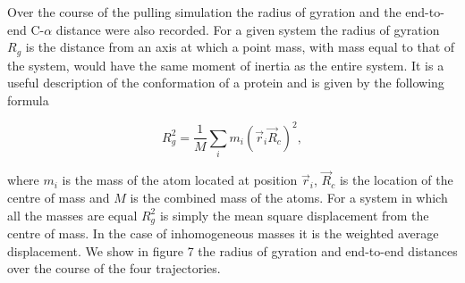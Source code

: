 \documentclass[12pt, onecolumn]{revtex4}    %
\begin{document}
Over the course of the pulling simulation the radius of gyration and the end-to-end C-$\alpha$ distance were also recorded.  For a given system the radius of gyration $R_g$ is the distance from an axis at which a point mass, with mass equal to that of the system, would have the same moment of inertia as the entire system.  It is a useful description of the conformation of a protein \cite{Rgyr} and is given by the following formula

\begin{equation}
R_g^2 = \frac{1}{M}\sum_i m_i (\vec{r}_i \vec{R}_c )^2, 
\end{equation}

where $m_i$ is the mass of the atom located at position $\vec{r}_i$, $\vec{R}_c$ is the location of the centre of mass and $M$ is the combined mass of the atoms.  For a system in which all the masses are equal $R_g^2$ is simply the mean square displacement from the centre of mass.  In the case of inhomogeneous masses it is the weighted average displacement.  We show in figure 7 the radius of gyration and end-to-end distances over the course of the four trajectories.\\
\end{document}

